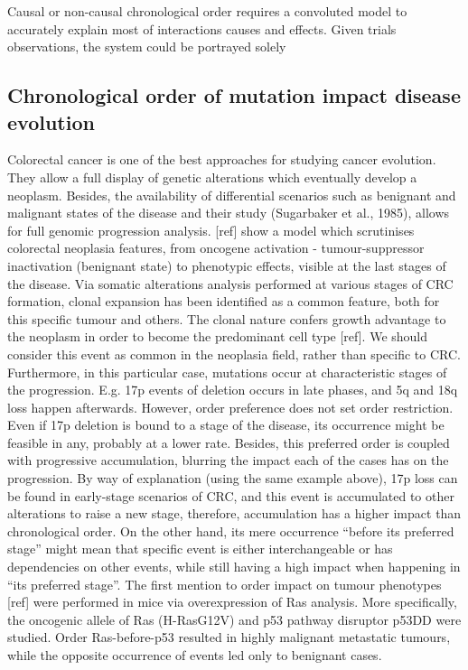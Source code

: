 
Causal or non-causal chronological order requires a convoluted model to accurately explain most of interactions causes and effects. Given trials observations, the system could be portrayed solely

\subsection{Chronological order of mutation impact disease evolution}
Colorectal cancer is one of the best approaches for studying cancer evolution. They allow a full display of genetic alterations which eventually develop a neoplasm. Besides, the availability of differential scenarios such as benignant and malignant states of the disease and their study (Sugarbaker et al., 1985), allows for full genomic progression analysis. [ref] show a model which scrutinises colorectal neoplasia features, from oncogene activation - tumour-suppressor inactivation (benignant state) to phenotypic effects, visible at the last stages of the disease.
Via somatic alterations analysis performed at various stages of CRC formation, clonal expansion has been identified as a common feature, both for this specific tumour and others. The clonal nature confers growth advantage to the neoplasm in order to become the predominant cell type [ref]. We should consider this event as common in the neoplasia field, rather than specific to CRC.
\\

Furthermore, in this particular case, mutations occur at characteristic stages of the progression. E.g. 17p events of deletion occurs in late phases, and 5q and 18q loss happen afterwards. However, order preference does not set order restriction. Even if 17p deletion is bound to a stage of the disease, its occurrence might be feasible in any, probably at a lower rate. Besides, this preferred order is coupled with progressive accumulation, blurring the impact each of the cases has on the progression. By way of explanation (using the same example above), 17p loss can be found in early-stage scenarios of CRC, and this event is accumulated to other alterations to raise a new stage,  therefore, accumulation has a higher impact than chronological order. On the other hand, its mere occurrence “before its preferred stage” might mean that specific event is either interchangeable or has dependencies on other events, while still having a high impact when happening in “its preferred stage”.
The first mention to order impact on tumour phenotypes [ref] were performed in mice via overexpression of Ras analysis. More specifically, the oncogenic allele of Ras (H-RasG12V) and p53 pathway disruptor p53DD were studied. Order Ras-before-p53 resulted in highly malignant metastatic tumours, while the opposite occurrence of events led only to benignant cases.
\\

